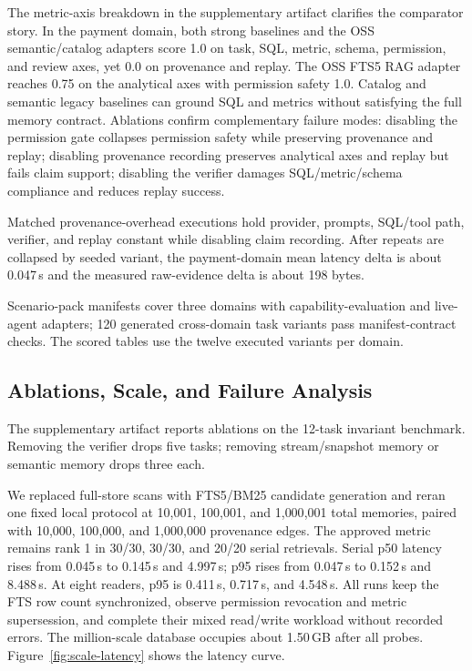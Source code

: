 \documentclass[sigconf,nonacm]{acmart}
\begin{document}
The metric-axis breakdown in the supplementary artifact clarifies the comparator story. In the payment domain, both strong baselines and the OSS semantic/catalog adapters score 1.0 on task, SQL, metric, schema, permission, and review axes, yet 0.0 on provenance and replay. The OSS FTS5 RAG adapter reaches 0.75 on the analytical axes with permission safety 1.0. Catalog and semantic legacy baselines can ground SQL and metrics without satisfying the full memory contract. Ablations confirm complementary failure modes: disabling the permission gate collapses permission safety while preserving provenance and replay; disabling provenance recording preserves analytical axes and replay but fails claim support; disabling the verifier damages SQL/metric/schema compliance and reduces replay success.

Matched provenance-overhead executions hold provider, prompts, SQL/tool path, verifier, and replay constant while disabling claim recording. After repeats are collapsed by seeded variant, the payment-domain mean latency delta is about 0.047\,s and the measured raw-evidence delta is about 198 bytes.

Scenario-pack manifests cover three domains with capability-evaluation and live-agent adapters; 120 generated cross-domain task variants pass manifest-contract checks. The scored tables use the twelve executed variants per domain.

\subsection{Ablations, Scale, and Failure Analysis}
The supplementary artifact reports ablations on the 12-task invariant benchmark. Removing the verifier drops five tasks; removing stream/snapshot memory or semantic memory drops three each.

We replaced full-store scans with FTS5/BM25 candidate generation and reran one fixed local protocol at 10{,}001, 100{,}001, and 1{,}000{,}001 total memories, paired with 10{,}000, 100{,}000, and 1{,}000{,}000 provenance edges. The approved metric remains rank 1 in 30/30, 30/30, and 20/20 serial retrievals. Serial p50 latency rises from 0.045\,s to 0.145\,s and 4.997\,s; p95 rises from 0.047\,s to 0.152\,s and 8.488\,s. At eight readers, p95 is 0.411\,s, 0.717\,s, and 4.548\,s. All runs keep the FTS row count synchronized, observe permission revocation and metric supersession, and complete their mixed read/write workload without recorded errors. The million-scale database occupies about 1.50\,GB after all probes. Figure~\ref{fig:scale-latency} shows the latency curve.
\end{document}
